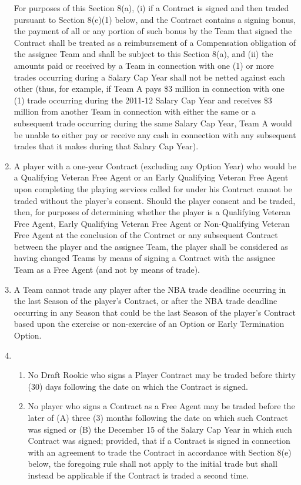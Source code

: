\documentclass[
]{book}
\providecommand{\tightlist}{%
  \setlength{\itemsep}{0pt}\setlength{\parskip}{0pt}}
\begin{document}
\begin{enumerate}
  For purposes of this Section 8(a), (i) if a Contract is signed and then traded pursuant to Section 8(e)(1) below, and the Contract contains a signing bonus, the payment of all or any portion of such bonus by the Team that signed the Contract shall be treated as a reimbursement of a Compensation obligation of the assignee Team and shall be subject to this Section 8(a), and (ii) the amounts paid or received by a Team in connection with one (1) or more trades occurring during a Salary Cap Year shall not be netted against each other (thus, for example, if Team A pays \$3 million in connection with one (1) trade occurring during the 2011-12 Salary Cap Year and receives \$3 million from another Team in connection with either the same or a subsequent trade occurring during the same Salary Cap Year, Team A would be unable to either pay or receive any cash in connection with any subsequent trades that it makes during that Salary Cap Year).
\item
  A player with a one-year Contract (excluding any Option Year) who would be a Qualifying Veteran Free Agent or an Early Qualifying Veteran Free Agent upon completing the playing services called for under his Contract cannot be traded without the player's consent. Should the player consent and be traded, then, for purposes of determining whether the player is a Qualifying Veteran Free Agent, Early Qualifying Veteran Free Agent or Non-Qualifying Veteran Free Agent at the conclusion of the Contract or any subsequent Contract between the player and the assignee Team, the player shall be considered as having changed Teams by means of signing a Contract with the assignee Team as a Free Agent (and not by means of trade).
\item
  A Team cannot trade any player after the NBA trade deadline occurring in the last Season of the player's Contract, or after the NBA trade deadline occurring in any Season that could be the last Season of the player's Contract based upon the exercise or non-exercise of an Option or Early Termination Option.
\item
  \begin{enumerate}
  \def\labelenumii{(\roman{enumii})}
  \tightlist
  \item
    No Draft Rookie who signs a Player Contract may be traded before thirty (30) days following the date on which the Contract is signed.
  \item
    No player who signs a Contract as a Free Agent may be traded before the later of (A) three (3) months following the date on which such Contract was signed or (B) the December 15 of the Salary Cap Year in which such Contract was signed; provided, that if a Contract is signed in connection with an agreement to trade the Contract in accordance with Section 8(e) below, the foregoing rule shall not apply to the initial trade but shall instead be applicable if the Contract is traded a second time.

\end{enumerate}
\end{enumerate}
\end{document}
